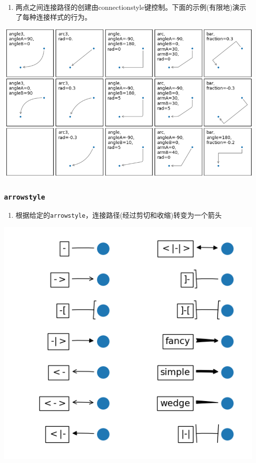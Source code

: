 \documentclass[UTF8,a4paper,12pt]{ctexart}  %
\providecommand{\tightlist}{\setlength{\itemsep}{0pt}\setlength{\parskip}{0pt}}
\newcommand{\passthrough}[1]{\lstset{mathescape=false}#1\lstset{mathescape=true}}
\begin{document}
\begin{enumerate}
\def\labelenumi{\arabic{enumi}.}
\tightlist
\item
  两点之间连接路径的创建由connectionstyle键控制。下面的示例(有限地)演示了每种连接样式的行为。
\end{enumerate}

\includegraphics{images/connectionstyle_demo.png}

\hypertarget{arrowstyle}{%
\subsubsection{\texorpdfstring{\texttt{arrowstyle}}{arrowstyle}}\label{arrowstyle}}

\begin{enumerate}
\def\labelenumi{\arabic{enumi}.}
\tightlist
\item
  根据给定的\passthrough{\lstinline!arrowstyle!}，连接路径(经过剪切和收缩)转变为一个箭头
\end{enumerate}

\includegraphics{images/fancyarrow_demo.png}
\end{document}
